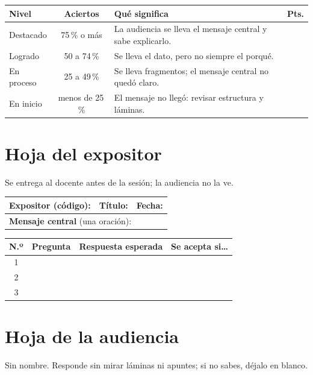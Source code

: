 \documentclass{academic-report}
\begin{document}
\noindent
\begin{tabularx}{\linewidth}{@{}l c X c@{}}
\toprule
\textbf{Nivel} & \textbf{Aciertos} & \textbf{Qué significa} & \textbf{Pts.} \\\midrule
Destacado  & 75\,\% o más    & La audiencia se lleva el mensaje central y sabe explicarlo. & \\
Logrado    & 50 a 74\,\%     & Se lleva el dato, pero no siempre el porqué.                & \\
En proceso & 25 a 49\,\%     & Se lleva fragmentos; el mensaje central no quedó claro.     & \\
En inicio  & menos de 25\,\% & El mensaje no llegó: revisar estructura y láminas.          & \\
\bottomrule
\end{tabularx}


\newpage
\section*{Hoja del expositor}
Se entrega al docente antes de la sesión; la audiencia no la ve.

\vspace{0.3em}
\noindent
\begin{tabularx}{\linewidth}{|X|X|X|}
\hline
\textbf{Expositor (código):} & \textbf{Título:} & \textbf{Fecha:} \\[0.5em]
\hline
\multicolumn{3}{|l|}{\textbf{Mensaje central} (una oración):} \\[1.6em]
\hline
\end{tabularx}

\vspace{0.4em}\noindent
\begin{tabularx}{\linewidth}{|c|X|X|X|}
\hline
\textbf{N.º} & \textbf{Pregunta} & \textbf{Respuesta esperada} & \textbf{Se acepta si\ldots} \\
\hline
1 & & & \rule[-4.2cm]{0pt}{4.2cm} \\
\hline
2 & & & \rule[-4.2cm]{0pt}{4.2cm} \\
\hline
3 & & & \rule[-4.2cm]{0pt}{4.2cm} \\
\hline
\end{tabularx}

\newpage
\section*{Hoja de la audiencia}
Sin nombre. Responde sin mirar láminas ni apuntes; si no sabes, déjalo en blanco.
\end{document}
